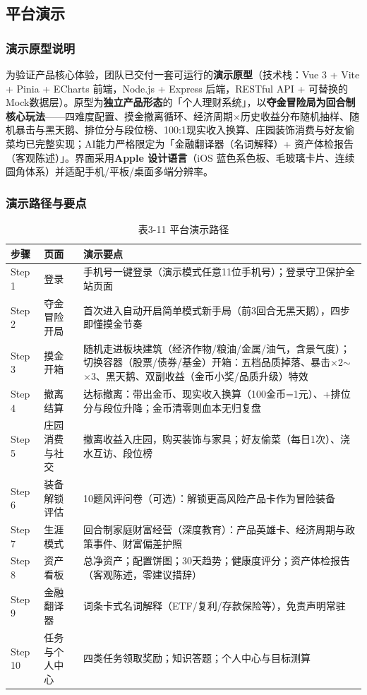 \documentclass[12pt,a4paper]{ctexart}
\begin{document}
\subsection{平台演示}

\subsubsection{演示原型说明}
为验证产品核心体验，团队已交付一套可运行的\textbf{演示原型}（技术栈：Vue 3 + Vite + Pinia + ECharts 前端，Node.js + Express 后端，RESTful API + 可替换的Mock数据层）。原型为\textbf{独立产品形态}的「个人理财系统」，以\textbf{夺金冒险局为回合制核心玩法}——四难度配置、摸金撤离循环、经济周期$\times$历史收益分布随机抽样、随机暴击与黑天鹅、排位分与段位榜、100:1现实收入换算、庄园装饰消费与好友偷菜均已完整实现；AI能力严格限定为「金融翻译器（名词解释）+ 资产体检报告（客观陈述）」。界面采用\textbf{Apple 设计语言}（iOS 蓝色系色板、毛玻璃卡片、连续圆角体系）并适配手机/平板/桌面多端分辨率。

\subsubsection{演示路径与要点}
\begin{table}[htbp]
\centering
\begin{tabular}{p{1.6cm}p{3.6cm}p{7.4cm}}
\toprule
\textbf{步骤} & \textbf{页面} & \textbf{演示要点} \\
\midrule
Step 1 & 登录 & 手机号一键登录（演示模式任意11位手机号）；登录守卫保护全站页面 \\
Step 2 & 夺金冒险开局 & 首次进入自动开启简单模式新手局（前3回合无黑天鹅），四步即懂摸金节奏 \\
Step 3 & 摸金开箱 & 随机走进板块建筑（经济作物/粮油/金属/油气，含景气度）；切换容器（股票/债券/基金）开箱：五档品质掉落、暴击$\times$2$\sim$$\times$3、黑天鹅、双副收益（金币小奖/品质升级）特效 \\
Step 4 & 撤离结算 & 达标撤离：带出金币、现实收入换算（100金币=1元）、+排位分与段位升降；金币清零则血本无归复盘 \\
Step 5 & 庄园消费与社交 & 撤离收益入庄园，购买装饰与家具；好友偷菜（每日1次）、浇水互访、段位榜 \\
Step 6 & 装备解锁评估 & 10题风评问卷（可选）：解锁更高风险产品卡作为冒险装备 \\
Step 7 & 生涯模式 & 回合制家庭财富经营（深度教育）：产品英雄卡、经济周期与政策事件、财富偏差护照 \\
Step 8 & 资产看板 & 总净资产；配置饼图；30天趋势；健康度评分；资产体检报告（客观陈述，零建议措辞） \\
Step 9 & 金融翻译器 & 词条卡式名词解释（ETF/复利/存款保险等），免责声明常驻 \\
Step 10 & 任务与个人中心 & 四类任务领取奖励；知识答题；个人中心与目标测算 \\
\bottomrule
\end{tabular}
\caption*{表3-11 \quad 平台演示路径}
\end{table}
\end{document}
